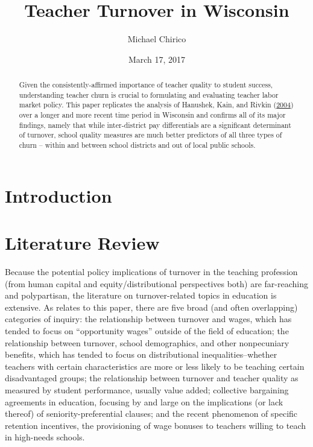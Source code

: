 \documentclass[]{article}
\title{Teacher Turnover in Wisconsin}
\author{Michael Chirico}
\date{March 17, 2017}
\begin{document}
\maketitle
\begin{abstract}
Given the consistently-affirmed importance of teacher quality to student
success, understanding teacher churn is crucial to formulating and
evaluating teacher labor market policy. This paper replicates the
analysis of Hanushek, Kain, and Rivkin
(\protect\hyperlink{ref-hanushek}{2004}) over a longer and more recent
time period in Wisconsin and confirms all of its major findings, namely
that while inter-district pay differentials are a significant
determinant of turnover, school quality measures are much better
predictors of all three types of churn -- within and between school
districts and out of local public schools.
\end{abstract}

\section{Introduction}\label{introduction}

\section{Literature Review}\label{literature-review}

Because the potential policy implications of turnover in the teaching
profession (from human capital and equity/distributional perspectives
both) are far-reaching and polypartisan, the literature on
turnover-related topics in education is extensive. As relates to this
paper, there are five broad (and often overlapping) categories of
inquiry: the relationship between turnover and wages, which has tended
to focus on ``opportunity wages'' outside of the field of education; the
relationship between turnover, school demographics, and other
nonpecuniary benefits, which has tended to focus on distributional
inequalities--whether teachers with certain characteristics are more or
less likely to be teaching certain disadvantaged groups; the
relationship between turnover and teacher quality as measured by student
performance, usually value added; collective bargaining agreements in
education, focusing by and large on the implications (or lack thereof)
of seniority-preferential clauses; and the recent phenomenon of specific
retention incentives, the provisioning of wage bonuses to teachers
willing to teach in high-needs schools.
\end{document}
